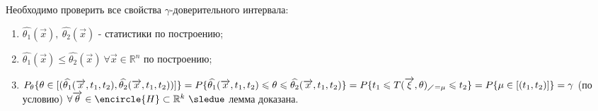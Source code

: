 \begin{lemma}
  \begin{dokvo}
      Необходимо проверить все свойства $\gamma$-доверительного интервала:
      \begin{enumerate}
        \item $\widehat{\theta_1}(\overrightarrow{x}), \ \widehat{\theta_2}(\overrightarrow{x})$ - статистики по построению;
        \item $\widehat{\theta_1}(\overrightarrow{x}) \leqslant \widehat{\theta_2}(\overrightarrow{x}) \ \forall \overrightarrow{x} \in \mathbb{R}^n$ по построению;
        \item $P_{\theta}\{\theta \in [(\widehat{\theta_1}(\overrightarrow{x},t_1,t_2),\widehat{\theta_2}(\overrightarrow{x},t_1,t_2))]\} =
        P\{\widehat{\theta_1}(\overrightarrow{x},t_1,t_2) \leqslant \theta \leqslant \widehat{\theta_2}(\overrightarrow{x},t_1,t_2)\} =
        P\{t_1 \leqslant T(\overrightarrow{\xi}, \theta)_{\diagup = \mu} \leqslant t_2\} =
        P\{\mu \in [(t_1,t_2)]\} = \gamma$ (по условию) $\forall \overrightarrow{\theta} \in \encircle{H} \subset \mathbb{R}^k \ \sledue$ лемма доказана.
      \end{enumerate}
  \end{dokvo}
\end{lemma}
